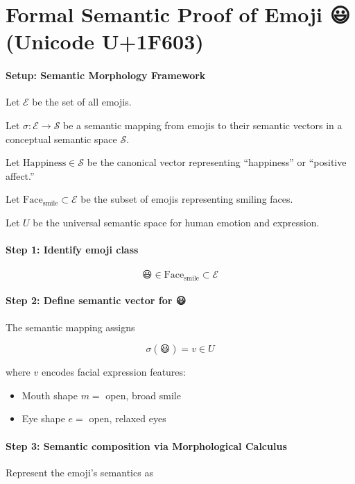 \documentclass{article}
\begin{document}
\section*{Formal Semantic Proof of Emoji 😃 (Unicode U+1F603)}

\paragraph{Setup: Semantic Morphology Framework}

Let $\mathcal{E}$ be the set of all emojis.

Let $\sigma : \mathcal{E} \to \mathcal{S}$ be a semantic mapping from emojis to their semantic vectors in a conceptual semantic space $\mathcal{S}$.

Let $\mathrm{Happiness} \in \mathcal{S}$ be the canonical vector representing ``happiness'' or ``positive affect.''

Let $\mathrm{Face}_{\mathrm{smile}} \subset \mathcal{E}$ be the subset of emojis representing smiling faces.

Let $U$ be the universal semantic space for human emotion and expression.

\paragraph{Step 1: Identify emoji class}

\[
\text{😃} \in \mathrm{Face}_{\mathrm{smile}} \subset \mathcal{E}
\]

\paragraph{Step 2: Define semantic vector for 😃}

The semantic mapping assigns

\[
\sigma(\text{😃}) = v \in U
\]

where $v$ encodes facial expression features:  
\begin{itemize}
    \item Mouth shape $m = $ open, broad smile
    \item Eye shape $e = $ open, relaxed eyes
\end{itemize}

\paragraph{Step 3: Semantic composition via Morphological Calculus}

Represent the emoji's semantics as
\end{document}
